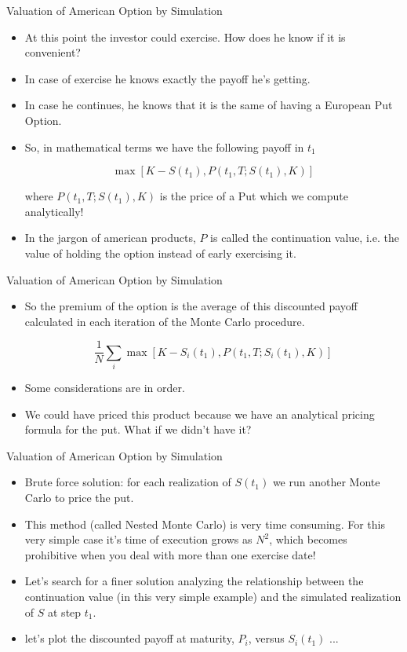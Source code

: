 \documentclass[11pt]{beamer}
\begin{document}
\begin{frame}{Valuation of American Option by Simulation}
\begin{itemize}
\item At this point the investor could exercise. How does he know if it is convenient? 
\item In case of exercise he knows exactly the payoff he's getting. 
\item In case he continues, he knows that it is the same of having a European Put Option.

\item So, in mathematical terms we have the following payoff in $t_1$

$$\max \left[
K-S(t_1), P(t_1,T;S(t_1),K)
\right] $$

where $P(t_1,T;S(t_1),K)$ is the price of a Put which we compute analytically! 
\item In the jargon of american products, $P$ is called the continuation value, i.e. the value of holding the option instead of early exercising it.

\end{itemize}
\end{frame}
\begin{frame}{Valuation of American Option by Simulation}
\begin{itemize}
\item So the premium of the option is the average of this discounted payoff calculated in each iteration of the Monte Carlo procedure.

$$
\frac{1}{N} \sum\limits_i
\max \left[
K-S_i(t_1), P(t_1,T;S_i(t_1),K)
\right] $$

\item Some considerations are in order. 
\item We could have priced this product because we have an analytical pricing formula for the put. What if we didn't have it? 

\end{itemize}
\end{frame}
\begin{frame}{Valuation of American Option by Simulation}
\begin{itemize}
\item Brute force solution: for each realization of $S(t_1)$ we run another Monte Carlo to price the put. 
\item This method (called Nested Monte Carlo) is very time consuming. For this very simple case it's time of execution grows as $N^2$, which becomes prohibitive when you deal with more than one exercise date!

\item Let's search for a finer solution analyzing the relationship between the continuation value (in this very simple example) and the simulated realization of $S$ at step $t_1$. 
\item let's plot the discounted payoff at maturity, $P_i$, versus $S_i(t_1)$ ... 
\end{itemize}
\end{frame}
\end{document}
